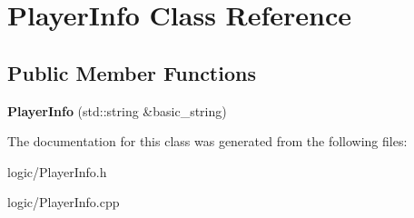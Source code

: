 \hypertarget{classPlayerInfo}{}\section{Player\+Info Class Reference}
\label{classPlayerInfo}
\subsection*{Public Member Functions}
\begin{DoxyCompactItemize}
\item 
\mbox{\label{classPlayerInfo_add5236b33c036a382f9032dac6196af4}} 
{\bfseries Player\+Info} (std\+::string \&basic\+\_\+string)
\end{DoxyCompactItemize}


The documentation for this class was generated from the following files\+:\begin{DoxyCompactItemize}
\item 
logic/Player\+Info.\+h\item 
logic/Player\+Info.\+cpp\end{DoxyCompactItemize}
